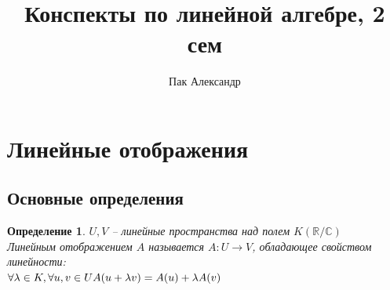 \documentclass[12pt]{article}
\title{Конспекты по линейной алгебре, 2 сем}
\author{Пак Александр}
\newtheorem{defin}{Определение}
\theoremstyle{remark}
\theoremstyle{definition}
\newcommand{\R}{\mathbb R}
\newcommand{\0}{\mathbb{0}}
\begin{document}
	\maketitle
	\newpage
	\setcounter{section}{6}
	\tableofcontents
	\newpage
	
	\section{Линейные отображения}
	
	\subsection{Основные определения}
	\begin{defin}
		$U, V$ -- линейные пространства над полем $K(\R/ \mathbb{C})$\\
	Линейным отображением $A$ называется $A: U \rightarrow V$, обладающее свойством линейности:\\
		$\forall \lambda \in K, \forall u, v \in U\\ 
		A(u + \lambda v) = A(u) + \lambda A(v)$
	\end{defin}
\end{document}
